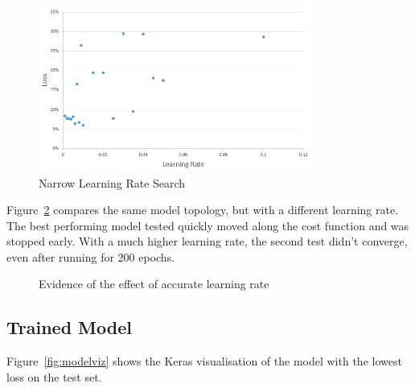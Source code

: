 \begin{figure}[H]
\caption{Narrow Learning Rate Search}  \label{fig:narrow_LR} 
\centering
\includegraphics[width=0.8\textwidth]{Figures/LearningRate2.PNG}
\end{figure}

Figure~\ref{fig:learningrate} compares the same model topology, but with a different learning rate. The best performing model tested quickly moved along the cost function and was stopped early. With a much higher learning rate, the second test didn't converge, even after running for 200 epochs.

\begin{figure}[H]
    \centering
    \caption{Evidence of the effect of accurate learning rate}
    \label{fig:learningrate}
\end{figure}

\subsection{Trained Model}

Figure~\ref{fig:modelviz} shows the Keras visualisation of the model with the lowest loss on the test set.

